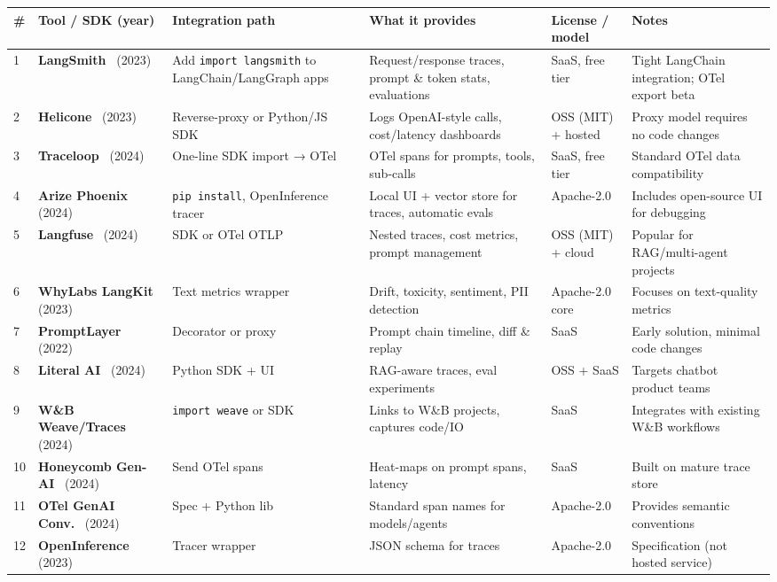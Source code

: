 \documentclass[sigplan,screen,9pt]{acmart}
\begin{document}
\begin{table*}[t]
\centering
\scriptsize
\begin{tabular}{p{0.5cm} p{2.2cm} p{2.3cm} p{2.8cm} p{1.8cm} p{2.5cm}}
\toprule
\# & Tool / SDK (year) & Integration path & What it provides & License / model & Notes \\
\midrule
1 & \textbf{LangSmith}~\cite{langsmith} (2023) & Add \texttt{import langsmith} to LangChain/LangGraph apps & Request/response traces, prompt \& token stats, evaluations & SaaS, free tier & Tight LangChain integration; OTel export beta \\
2 & \textbf{Helicone}~\cite{helicone} (2023) & Reverse-proxy or Python/JS SDK & Logs OpenAI-style calls, cost/latency dashboards & OSS (MIT) + hosted & Proxy model requires no code changes \\
3 & \textbf{Traceloop}~\cite{traceloop} (2024) & One-line SDK import → OTel & OTel spans for prompts, tools, sub-calls & SaaS, free tier & Standard OTel data compatibility \\
4 & \textbf{Arize Phoenix}~\cite{phoenix} (2024) & \texttt{pip install}, OpenInference tracer & Local UI + vector store for traces, automatic evals & Apache-2.0 & Includes open-source UI for debugging \\
5 & \textbf{Langfuse}~\cite{langfuse} (2024) & SDK or OTel OTLP & Nested traces, cost metrics, prompt management & OSS (MIT) + cloud & Popular for RAG/multi-agent projects \\
6 & \textbf{WhyLabs LangKit}~\cite{whylabs} (2023) & Text metrics wrapper & Drift, toxicity, sentiment, PII detection & Apache-2.0 core & Focuses on text-quality metrics \\
7 & \textbf{PromptLayer}~\cite{promptlayer} (2022) & Decorator or proxy & Prompt chain timeline, diff \& replay & SaaS & Early solution, minimal code changes \\
8 & \textbf{Literal AI}~\cite{literalai} (2024) & Python SDK + UI & RAG-aware traces, eval experiments & OSS + SaaS & Targets chatbot product teams \\
9 & \textbf{W\&B Weave/Traces}~\cite{wandb} (2024) & \texttt{import weave} or SDK & Links to W\&B projects, captures code/IO & SaaS & Integrates with existing W\&B workflows \\
10 & \textbf{Honeycomb Gen-AI}~\cite{honeycomb} (2024) & Send OTel spans & Heat-maps on prompt spans, latency & SaaS & Built on mature trace store \\
11 & \textbf{OTel GenAI Conv.}~\cite{otelgenai} (2024) & Spec + Python lib & Standard span names for models/agents & Apache-2.0 & Provides semantic conventions \\
12 & \textbf{OpenInference}~\cite{openinference} (2023) & Tracer wrapper & JSON schema for traces & Apache-2.0 & Specification (not hosted service) \\
\bottomrule
\end{tabular}
\end{table*}
\end{document}
